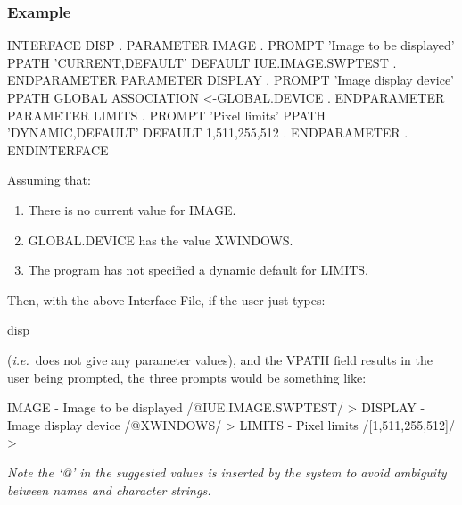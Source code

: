 \documentclass[twoside,11pt,nolof]{starlink}
\begin{document}
\subsubsection*{Example}
\begin{terminalv}
INTERFACE DISP
   .
   PARAMETER IMAGE
         .
      PROMPT 'Image to be displayed'
      PPATH 'CURRENT,DEFAULT'
      DEFAULT IUE.IMAGE.SWPTEST
         .
   ENDPARAMETER
   PARAMETER DISPLAY
         .
      PROMPT 'Image display device'
      PPATH GLOBAL
      ASSOCIATION <-GLOBAL.DEVICE
         .
   ENDPARAMETER
   PARAMETER LIMITS
         .
      PROMPT 'Pixel limits'
      PPATH 'DYNAMIC,DEFAULT'
      DEFAULT 1,511,255,512
         .
   ENDPARAMETER
      .
ENDINTERFACE
\end{terminalv}
Assuming that:
\begin{enumerate}
\item There is no current value for IMAGE.
\item GLOBAL.DEVICE has the value XWINDOWS.
\item The program has not specified a dynamic default for LIMITS.
\end{enumerate}
Then, with the above Interface File, if the user just types:
\begin{terminalv}
disp
\end{terminalv}
(\emph{i.e.}\ does not give any parameter values), and the VPATH field
results in the user being prompted, the three prompts would be something like:
\begin{terminalv}
IMAGE - Image to be displayed /@IUE.IMAGE.SWPTEST/ >
DISPLAY - Image display device /@XWINDOWS/ >
LIMITS - Pixel limits /[1,511,255,512]/ >
\end{terminalv}
\emph{Note the `@' in the suggested values is inserted by the system to avoid
ambiguity between names and character strings.}
\end{document}
